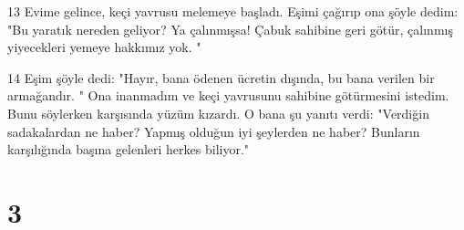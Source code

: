 \par 13 Evime gelince, keçi yavrusu melemeye başladı. Eşimi çağırıp ona şöyle dedim: "Bu yaratık nereden geliyor? Ya çalınmışsa! Çabuk sahibine geri götür, çalınmış yiyecekleri yemeye hakkımız yok. "
\par 14 Eşim şöyle dedi: "Hayır, bana ödenen ücretin dışında, bu bana verilen bir armağandır. " Ona inanmadım ve keçi yavrusunu sahibine götürmesini istedim. Bunu söylerken karşısında yüzüm kızardı. O bana şu yanıtı verdi: "Verdiğin sadakalardan ne haber? Yapmış olduğun iyi şeylerden ne haber? Bunların karşılığında başına gelenleri herkes biliyor."

\chapter{3}

